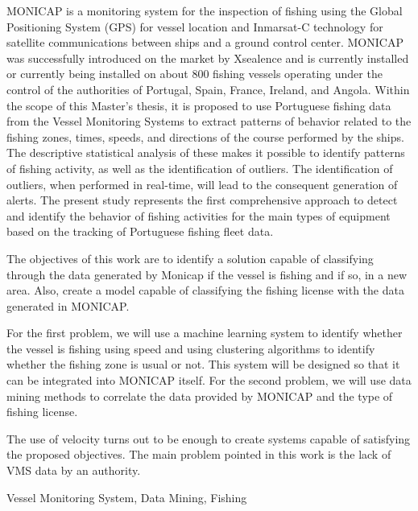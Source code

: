 \abstractEN %

MONICAP is a monitoring system for the inspection of fishing using the Global Positioning System (GPS) for vessel location and Inmarsat-C technology for satellite communications between ships and a ground control center. MONICAP was successfully introduced on the market by Xsealence and is currently installed or currently being installed on about 800 fishing vessels operating under the control of the authorities of Portugal, Spain, France, Ireland, and Angola. Within the scope of this Master's thesis, it is proposed to use Portuguese fishing data from the Vessel Monitoring Systems to extract patterns of behavior related to the fishing zones, times, speeds, and directions of the course performed by the ships. The descriptive statistical analysis of these makes it possible to identify patterns of fishing activity, as well as the identification of outliers. The identification of outliers, when performed in real-time, will lead to the consequent generation of alerts. The present study represents the first comprehensive approach to detect and identify the behavior of fishing activities for the main types of equipment based on the tracking of Portuguese fishing fleet data.

The objectives of this work are to identify a solution capable of classifying through the data generated by Monicap if the vessel is fishing and if so, in a new area. Also, create a model capable of classifying the fishing license with the data generated in MONICAP.

For the first problem, we will use a machine learning system to identify whether the vessel is fishing using speed and using clustering algorithms to identify whether the fishing zone is usual or not.
This system will be designed so that it can be integrated into MONICAP itself.
For the second problem, we will use data mining methods to correlate the data provided by MONICAP and the type of fishing license.

The use of velocity turns out to be enough to create systems capable of satisfying the proposed objectives.
The main problem pointed in this work is the lack of VMS data by an authority.



\begin{keywords}
Vessel Monitoring System, Data Mining, Fishing
\end{keywords} 
